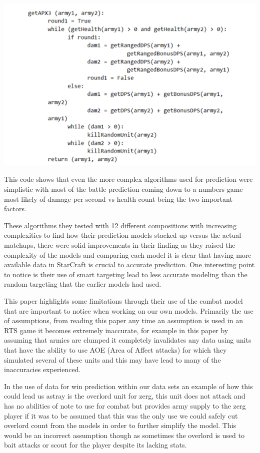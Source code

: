 \documentclass[a4paper,12pt]{report}
\begin{document}
\begin{center}
    \captionsetup{type=figure}
    \includegraphics[width=.9\linewidth]{media/APXcode.png}
\end{center}

This code shows that even the more complex algorithms used for prediction were simplistic with most of the battle prediction coming down to a numbers game most likely of damage per second vs health count being the two important factors.

These algorithms they tested with 12 different compositions with increasing complexities to find how their prediction models stacked up versus the actual matchups, there were solid improvements in their finding as they raised the complexity of the models and comparing each model it is clear that having more available data in StarCraft is crucial to accurate prediction. One interesting point to notice is their use of smart targeting lead to less accurate modeling than the random targeting that the earlier models had used.

This paper highlights some limitations through their use of the combat model that are important to notice when working on our own models. Primarily the use of assumptions, from reading this paper any time an assumption is used in an RTS game it becomes extremely inaccurate, for example in this paper by assuming that armies are clumped it completely invalidates any data using units that have the ability to use AOE (Area of Affect attacks) for which they simulated several of these units and this may have lead to many of the inaccuracies experienced.

In the use of data for win prediction within our data sets an example of how this could lead us astray is the overlord unit for zerg, this unit does not attack and has no abilities of note to use for combat but provides army supply to the zerg player if it was to be assumed that this was the only use we could safely cut overlord count from the models in order to further simplify the model. This would be an incorrect assumption though as sometimes the overlord is used to bait attacks or scout for the player despite its lacking stats.
\end{document}
